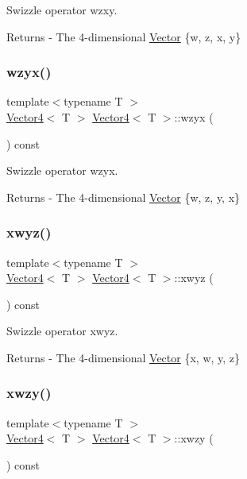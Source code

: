 Swizzle operator wzxy. \begin{DoxyReturn}{Returns}
-\/ The 4-\/dimensional \mbox{\hyperlink{class_vector}{Vector}} \{w, z, x, y\} 
\end{DoxyReturn}
\mbox{\label{class_vector4_a18b606df692b9f081c544c0c061863fc}} 
\subsubsection{\texorpdfstring{wzyx()}{wzyx()}}
{\footnotesize\ttfamily template$<$typename T $>$ \\
\mbox{\hyperlink{class_vector4}{Vector4}}$<$ T $>$ \mbox{\hyperlink{class_vector4}{Vector4}}$<$ T $>$\+::wzyx (\begin{DoxyParamCaption}{ }\end{DoxyParamCaption}) const}

Swizzle operator wzyx. \begin{DoxyReturn}{Returns}
-\/ The 4-\/dimensional \mbox{\hyperlink{class_vector}{Vector}} \{w, z, y, x\} 
\end{DoxyReturn}
\mbox{\label{class_vector4_aaa46ea3999294d8930b33003e7eb7d24}} 
\subsubsection{\texorpdfstring{xwyz()}{xwyz()}}
{\footnotesize\ttfamily template$<$typename T $>$ \\
\mbox{\hyperlink{class_vector4}{Vector4}}$<$ T $>$ \mbox{\hyperlink{class_vector4}{Vector4}}$<$ T $>$\+::xwyz (\begin{DoxyParamCaption}{ }\end{DoxyParamCaption}) const}

Swizzle operator xwyz. \begin{DoxyReturn}{Returns}
-\/ The 4-\/dimensional \mbox{\hyperlink{class_vector}{Vector}} \{x, w, y, z\} 
\end{DoxyReturn}
\mbox{\label{class_vector4_a192e0d572d635a87bf356201bb16c5ce}} 
\subsubsection{\texorpdfstring{xwzy()}{xwzy()}}
{\footnotesize\ttfamily template$<$typename T $>$ \\
\mbox{\hyperlink{class_vector4}{Vector4}}$<$ T $>$ \mbox{\hyperlink{class_vector4}{Vector4}}$<$ T $>$\+::xwzy (\begin{DoxyParamCaption}{ }\end{DoxyParamCaption}) const}

